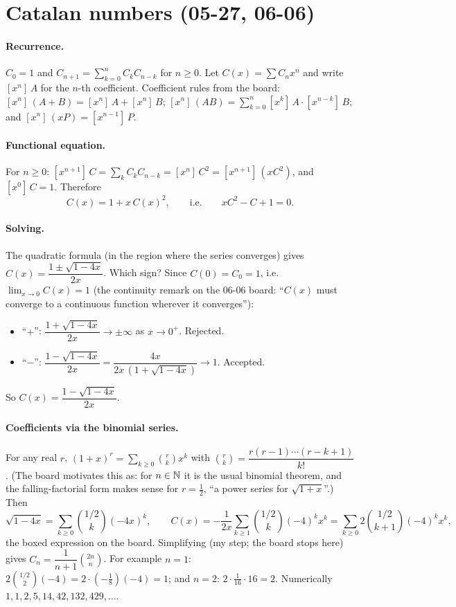\documentclass[11pt]{article}
\newcommand{\coef}[2]{[x^{#1}]\,#2}
\begin{document}
\section{Catalan numbers (05-27, 06-06)}

\paragraph{Recurrence.} $C_0=1$ and $C_{n+1}=\sum_{k=0}^nC_kC_{n-k}$ for $n\ge0$. Let $C(x)=\sum C_nx^n$ and write $\coef nA$ for the $n$-th coefficient. Coefficient rules from the board: $\coef n{(A+B)}=\coef nA+\coef nB$; $\coef n{(AB)}=\sum_{k=0}^n\coef kA\cdot\coef{n-k}B$; and $\coef n{(xP)}=\coef{n-1}P$.

\paragraph{Functional equation.} For $n\ge0$: $\coef{n+1}C=\sum_kC_kC_{n-k}=\coef n{C^2}=\coef{n+1}{(xC^2)}$, and $\coef0C=1$. Therefore
\[
C(x)=1+x\,C(x)^2,\qquad\text{i.e.}\qquad xC^2-C+1=0.
\]

\paragraph{Solving.} The quadratic formula (in the region where the series converges) gives $C(x)=\dfrac{1\pm\sqrt{1-4x}}{2x}$. Which sign? Since $C(0)=C_0=1$, i.e.\ $\lim_{x\to0}C(x)=1$ (the continuity remark on the 06-06 board: ``$C(x)$ must converge to a continuous function wherever it converges''):
\begin{itemize}[nosep]
  \item ``$+$'': $\dfrac{1+\sqrt{1-4x}}{2x}\to\pm\infty$ as $x\to0^+$. Rejected.
  \item ``$-$'': $\dfrac{1-\sqrt{1-4x}}{2x}=\dfrac{4x}{2x\,(1+\sqrt{1-4x})}\to1$. Accepted.
\end{itemize}
So $C(x)=\dfrac{1-\sqrt{1-4x}}{2x}$.

\paragraph{Coefficients via the binomial series.} For any real $r$, $(1+x)^r=\sum_{k\ge0}\binom rkx^k$ with $\binom rk=\dfrac{r(r-1)\cdots(r-k+1)}{k!}$. (The board motivates this as: for $n\in\mathbb{N}$ it is the usual binomial theorem, and the falling-factorial form makes sense for $r=\tfrac12$, ``a power series for $\sqrt{1+x}$''.) Then
\[
\sqrt{1-4x}=\sum_{k\ge0}\binom{1/2}k(-4x)^k,\qquad
C(x)=-\frac1{2x}\sum_{k\ge1}\binom{1/2}k(-4)^kx^k=\sum_{k\ge0}2\binom{1/2}{k+1}(-4)^kx^k,
\]
the boxed expression on the board. Simplifying (my step; the board stops here) gives $C_n=\dfrac1{n+1}\binom{2n}n$. For example $n=1$: $2\binom{1/2}2(-4)=2\cdot(-\tfrac18)(-4)=1$; and $n=2$: $2\cdot\tfrac1{16}\cdot16=2$. Numerically $1,1,2,5,14,42,132,429,\dots$.
\end{document}
